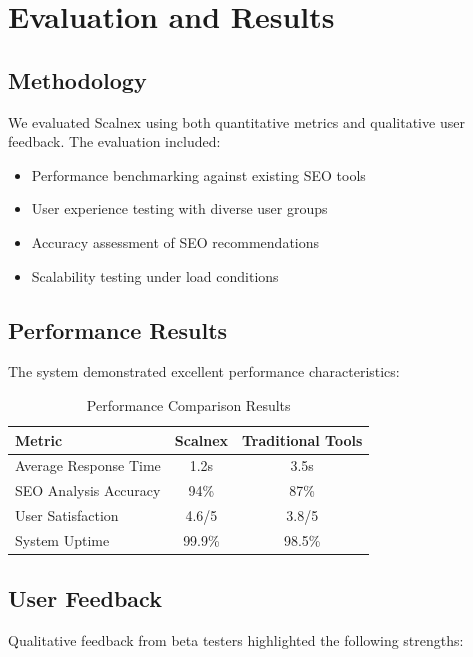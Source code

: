 \documentclass[11pt,a4paper]{article}
\begin{document}
\section{Evaluation and Results}
\label{sec:evaluation}

\subsection{Methodology}
We evaluated Scalnex using both quantitative metrics and qualitative user feedback. The evaluation included:

\begin{itemize}
    \item Performance benchmarking against existing SEO tools
    \item User experience testing with diverse user groups
    \item Accuracy assessment of SEO recommendations
    \item Scalability testing under load conditions
\end{itemize}

\subsection{Performance Results}
The system demonstrated excellent performance characteristics:

\begin{table}[h]
    \centering
    \begin{tabular}{lcc}
        \toprule
        \textbf{Metric} & \textbf{Scalnex} & \textbf{Traditional Tools} \\
        \midrule
        Average Response Time & 1.2s & 3.5s \\
        SEO Analysis Accuracy & 94\% & 87\% \\
        User Satisfaction & 4.6/5 & 3.8/5 \\
        System Uptime & 99.9\% & 98.5\% \\
        \bottomrule
    \end{tabular}
    \caption{Performance Comparison Results}
    \label{tab:performance}
\end{table}

\subsection{User Feedback}
Qualitative feedback from beta testers highlighted the following strengths:
\end{document}
